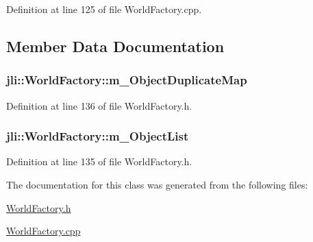Definition at line 125 of file World\+Factory.\+cpp.



\subsection{Member Data Documentation}
\hypertarget{classjli_1_1_world_factory_a67d271ea8de7eaee463069a9e3e46f4e}{
\subsubsection[{m\+\_\+\+Object\+Duplicate\+Map}]{ jli\+::\+World\+Factory\+::m\+\_\+\+Object\+Duplicate\+Map}}\label{classjli_1_1_world_factory_a67d271ea8de7eaee463069a9e3e46f4e}


Definition at line 136 of file World\+Factory.\+h.

\hypertarget{classjli_1_1_world_factory_ac1a42314be66db6555d7723a35d2cdbc}{
\subsubsection[{m\+\_\+\+Object\+List}]{ jli\+::\+World\+Factory\+::m\+\_\+\+Object\+List}}\label{classjli_1_1_world_factory_ac1a42314be66db6555d7723a35d2cdbc}


Definition at line 135 of file World\+Factory.\+h.



The documentation for this class was generated from the following files\+:\begin{DoxyCompactItemize}
\item 
\hyperlink{_world_factory_8h}{World\+Factory.\+h}\item 
\hyperlink{_world_factory_8cpp}{World\+Factory.\+cpp}\end{DoxyCompactItemize}

